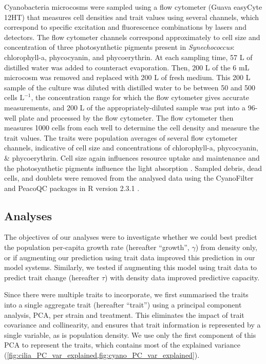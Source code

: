 \documentclass{article}
\begin{document}
Cyanobacteria microcosms were sampled using a flow cytometer (Guava easyCyte 12HT) that measures cell densities and trait values using several channels, which correspond to specific excitation and fluorescence combinations by lasers and detectors. The flow cytometer channels correspond approximately to cell size and concentration of three photosynthetic pigments present in \textit{Synechococcus}: chlorophyll-a, phycocyanin, and phycoerythrin. At each sampling time, 57 \textmu L of distilled water was added to counteract evaporation. Then, 200 \textmu L of the 6 mL microcosm was removed and replaced with 200 \textmu L of fresh medium. This 200 \textmu L sample of the culture was diluted with distilled water to be between 50 and 500 cells \textmu $\mathrm{L}^{-1}$, the concentration range for which the flow cytometer gives accurate measurements, and 200 \textmu L of the appropriately-diluted sample was put into a 96-well plate and processed by the flow cytometer. The flow cytometer then measures 1000 cells from each well to determine the cell density and measure the trait values. The traits were population averages of several flow cytometer channels, indicative of cell size and concentrations of chlorophyll-a, phycocyanin, \& phycoerythrin. Cell size again influences resource uptake and maintenance and the photosynthetic pigments influence the light absorption \cite{Maranon2015,Stomp2007a}. Sampled debris, dead cells, and doublets were removed from the analysed data using the CyanoFilter and PeacoQC packages in R version 2.3.1 \cite{Olusoji2021,PeacoQC,RCoreTeam2023}. 

\subsection{Analyses}

The objectives of our analyses were to investigate whether we could best predict the population per-capita growth rate (hereafter ``growth'', $\gamma$) from density only, or if augmenting our prediction using trait data improved this prediction in our model systems. Similarly, we tested if augmenting this model using trait data to predict trait change 
(hereafter $\tau$) with density data improved predictive capacity.

Since there were multiple traits to incorporate, we first summarised the traits into a single aggregate trait (hereafter ``trait'') using a principal component analysis, PCA, per strain and treatment. This eliminates the impact of trait covariance and collinearity, and ensures that trait information is represented by a single variable, as is population density. We use only the first component of this PCA to represent the traits, which contains most of the explained variance (\cref{fig:cilia_PC_var_explained,fig:cyano_PC_var_explained}).
\end{document}
